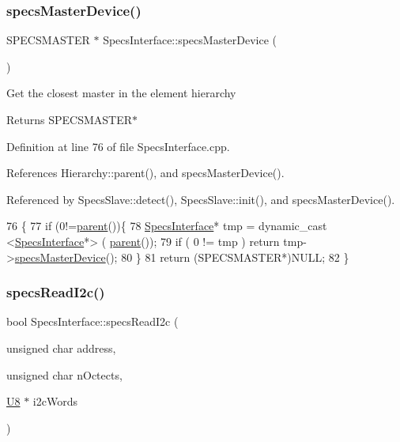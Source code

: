 \subsubsection{\texorpdfstring{specs\+Master\+Device()}{specsMasterDevice()}}
{\footnotesize\ttfamily S\+P\+E\+C\+S\+M\+A\+S\+T\+ER $\ast$ Specs\+Interface\+::specs\+Master\+Device (\begin{DoxyParamCaption}{ }\end{DoxyParamCaption})\hspace{0.3cm}{\ttfamily [virtual]}}

Get the closest master in the element hierarchy \begin{DoxyReturn}{Returns}
S\+P\+E\+C\+S\+M\+A\+S\+T\+E\+R$\ast$ 
\end{DoxyReturn}


Definition at line 76 of file Specs\+Interface.\+cpp.



References Hierarchy\+::parent(), and specs\+Master\+Device().



Referenced by Specs\+Slave\+::detect(), Specs\+Slave\+::init(), and specs\+Master\+Device().


\begin{DoxyCode}
76                                               \{
77     \textcolor{keywordflow}{if} (0!=\hyperlink{classHierarchy_a1c7bec8257e717f9c1465e06ebf845fc}{parent}())\{
78     \hyperlink{classSpecsInterface}{SpecsInterface}* tmp = dynamic\_cast <\hyperlink{classSpecsInterface}{SpecsInterface}*> (
      \hyperlink{classHierarchy_a1c7bec8257e717f9c1465e06ebf845fc}{parent}());
79     \textcolor{keywordflow}{if} ( 0 != tmp ) \textcolor{keywordflow}{return} tmp->\hyperlink{classSpecsInterface_aa8aeaa74acf2c913905ea996d153a6ef}{specsMasterDevice}();
80     \}
81   \textcolor{keywordflow}{return} (SPECSMASTER*)NULL;
82 \}
\end{DoxyCode}
\mbox{\label{classSpecsInterface_a7e9a0fe69a998e624ca2d7339b61bcb5}} 
\subsubsection{\texorpdfstring{specs\+Read\+I2c()}{specsReadI2c()}\hspace{0.1cm}{\footnotesize\ttfamily [1/4]}}
{\footnotesize\ttfamily bool Specs\+Interface\+::specs\+Read\+I2c (\begin{DoxyParamCaption}\item[{unsigned char}]{address,  }\item[{unsigned char}]{n\+Octects,  }\item[{\hyperlink{ICECALv3_8h_a3cb25ca6f51f003950f9625ff05536fc}{U8} $\ast$}]{i2c\+Words }\end{DoxyParamCaption})}

